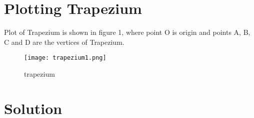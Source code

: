 \documentclass[journal,10pt,twocolumn]{article}
\begin{document}
\section{Plotting Trapezium}




\vspace{0.25cm}
Plot of Trapezium is shown in figure 1, where point O is origin and points A, B, C and D are the vertices of Trapezium.
\begin{figure}[h]

\texttt{[image: trapezium1.png]}
\caption{trapezium}
\label{fig:trapezium}
\end{figure}


\section{Solution}

\vspace{0.25cm}
\end{document}
